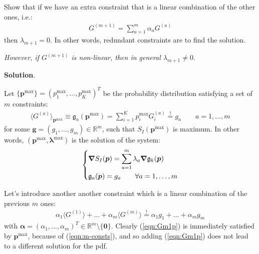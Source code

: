 \documentclass[../template.tex]{subfiles}
\begin{document}
\begin{exo}
    Show that if we have an extra constraint that is a linear combination of the other ones, i.e.:
    \begin{align}\label{eqn:Gm1}
        G^{(m+1)} = \sum_{a=1}^m \alpha_a G^{(a)}
    \end{align}
    then $\lambda_{m+1} = 0$. In other words, redundant constraints are  to find the solution.

    \medskip

    \textit{However, if $G^{(m+1)}$ is non-linear, then in general $\lambda_{m+1} \neq 0$.}
    
    \medskip

    \textbf{Solution}.

    Let $\{\bm{p}^{\max}\} = (p_1^{\max},\dots, p_K^{\max})^T$ be the probability distribution satisfying a set of $m$ constraints:
    \begin{align}\label{eqn:m-consts}
        \langle G^{(a)} \rangle_{\bm{p}^{\max}} \equiv \mathfrak{g}_a(\bm{p}^{\max}) = \sum_{i=1}^K p_i^{\max} G_i^{(a)} \overset{!}{=} g_a \qquad a=1,\dots,m
    \end{align}
    for some $\bm{g} = (g_1,\dots,g_m) \in \mathbb{R}^m$,    such that $S_I(\bm{p}^{\max})$ is maximum. In other words, $(\bm{p}^{\max}, \bm{\lambda}^{\max})$ is the solution of the system:
    \begin{align}\label{eqn:Lag1}
        \begin{dcases}
            \grad S_I(\bm{p}) = \sum_{a=1}^m \lambda_a \grad \mathfrak{g}_k (\bm{p}) \\
            \mathfrak{g}_a(\bm{p}) = g_a \qquad \forall a = 1,\dots,m
        \end{dcases}
    \end{align}


    Let's introduce another another constraint which is a linear combination of the previous $m$ ones:
    \begin{align} \label{eqn:Gm1p}
        \alpha_1 \langle G^{(1)} \rangle + \dots + \alpha_m \langle G^{(m)} \rangle \overset{!}{=} \alpha_1 g_1 + \dots + \alpha_m g_m
    \end{align} 
    with $\bm{\alpha} = (\alpha_1, \dots, \alpha_m)^T \in \mathbb{R}^m \setminus \{\bm{0}\}$. Clearly (\ref{eqn:Gm1p}) is immediately satisfied by $\bm{p}^{\max}$, because of (\ref{eqn:m-consts}), and so adding (\ref{eqn:Gm1p}) does not lead to a different solution for the pdf.


\end{exo}
\end{document}
